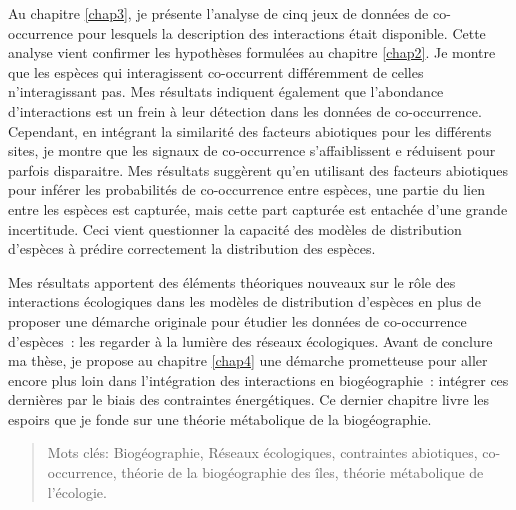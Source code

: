 Au chapitre \ref{chap3}, je présente l'analyse de cinq jeux de données
de co-occurrence pour lesquels la description des interactions était
disponible. Cette analyse vient confirmer les hypothèses formulées au
chapitre \ref{chap2}. Je montre que les espèces qui interagissent
co-occurrent différemment de celles n'interagissant pas. Mes résultats
indiquent également que l'abondance d'interactions est un frein à leur
détection dans les données de co-occurrence. Cependant, en intégrant la
similarité des facteurs abiotiques pour les différents sites, je montre
que les signaux de co-occurrence s'affaiblissent e réduisent pour
parfois disparaitre. Mes résultats suggèrent qu'en utilisant des
facteurs abiotiques pour inférer les probabilités de co-occurrence entre
espèces, une partie du lien entre les espèces est capturée, mais cette
part capturée est entachée d'une grande incertitude. Ceci vient
questionner la capacité des modèles de distribution d'espèces à prédire
correctement la distribution des espèces.

Mes résultats apportent des éléments théoriques nouveaux sur le rôle des
interactions écologiques dans les modèles de distribution d'espèces en
plus de proposer une démarche originale pour étudier les données de
co-occurrence d'espèces~: les regarder à la lumière des réseaux
écologiques. Avant de conclure ma thèse, je propose au chapitre
\ref{chap4} une démarche prometteuse pour aller encore plus loin dans
l'intégration des interactions en biogéographie~: intégrer ces dernières
par le biais des contraintes énergétiques. Ce dernier chapitre livre les
espoirs que je fonde sur une théorie métabolique de la biogéographie.

\begin{quote}
Mots clés: Biogéographie, Réseaux écologiques, contraintes abiotiques,
co-occurrence, théorie de la biogéographie des îles, théorie métabolique
de l'écologie.
\end{quote}
